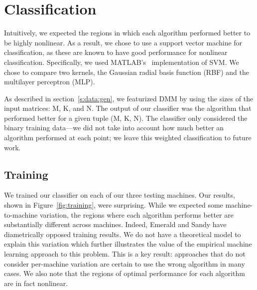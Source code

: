 \section{Classification}
\label{s:classification}

Intuitively, we expected the regions in which each algorithm performed better to be highly nonlinear.
As a result, we chose to use a support vector machine for classification, as these are known to have good performance for nonlinear classification.
Specifically, we used MATLAB's~\cite{MATLAB2011} implementation of SVM.
We chose to compare two kernels, the Gaussian radial basis function (RBF) and the multilayer perceptron (MLP).

As described in section~\ref{s:data:gen}, we featurized DMM by using the sizes of the input matrices: M, K, and N.
The output of our classifier was the algorithm that performed better for a given tuple (M, K, N).
The classifier only considered the binary training data---we did not take into account how much better an algorithm performed at each point; we leave this weighted classification to future work.

\subsection{Training}
We trained our classifier on each of our three testing machines.
Our results, shown in Figure~\ref{fig:training}, were surprising.
While we expected some machine-to-machine variation, the regions where each algorithm performs better are substantially different across machines.
Indeed, Emerald and Sandy have diametrically opposed training results.
We do not have a theoretical model to explain this variation which further illustrates the value of the empirical machine learning approach to this problem.
This is a key result: approaches that do not consider per-machine variation are certain to use the wrong algorithm in many cases.
We also note that the regions of optimal performance for each algorithm are in fact nonlinear.

